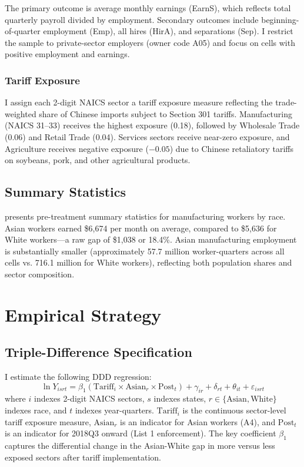 \documentclass[12pt]{article}
\begin{document}
The primary outcome is average monthly earnings (EarnS), which reflects total quarterly payroll divided by employment. Secondary outcomes include beginning-of-quarter employment (Emp), all hires (HirA), and separations (Sep). I restrict the sample to private-sector employers (owner code A05) and focus on cells with positive employment and earnings.

\subsubsection*{Tariff Exposure} I assign each 2-digit NAICS sector a tariff exposure measure reflecting the trade-weighted share of Chinese imports subject to Section 301 tariffs. Manufacturing (NAICS 31--33) receives the highest exposure (0.18), followed by Wholesale Trade (0.06) and Retail Trade (0.04). Services sectors receive near-zero exposure, and Agriculture receives negative exposure ($-0.05$) due to Chinese retaliatory tariffs on soybeans, pork, and other agricultural products.

\subsection{Summary Statistics}



 presents pre-treatment summary statistics for manufacturing workers by race. Asian workers earned \$6,674 per month on average, compared to \$5,636 for White workers---a raw gap of \$1,038 or 18.4\%. Asian manufacturing employment is substantially smaller (approximately 57.7 million worker-quarters across all cells vs. 716.1 million for White workers), reflecting both population shares and sector composition.

\section{Empirical Strategy}

\subsection{Triple-Difference Specification}

I estimate the following DDD regression:
\begin{equation}
\ln Y_{isrt} = \beta_1 (\text{Tariff}_i \times \text{Asian}_r \times \text{Post}_t) + \gamma_{ir} + \delta_{rt} + \theta_{it} + \varepsilon_{isrt}
\label{eq:ddd}
\end{equation}
where $i$ indexes 2-digit NAICS sectors, $s$ indexes states, $r \in \{\text{Asian}, \text{White}\}$ indexes race, and $t$ indexes year-quarters. $\text{Tariff}_i$ is the continuous sector-level tariff exposure measure, $\text{Asian}_r$ is an indicator for Asian workers (A4), and $\text{Post}_t$ is an indicator for 2018Q3 onward (List 1 enforcement). The key coefficient $\beta_1$ captures the differential change in the Asian-White gap in more versus less exposed sectors after tariff implementation.
\end{document}
